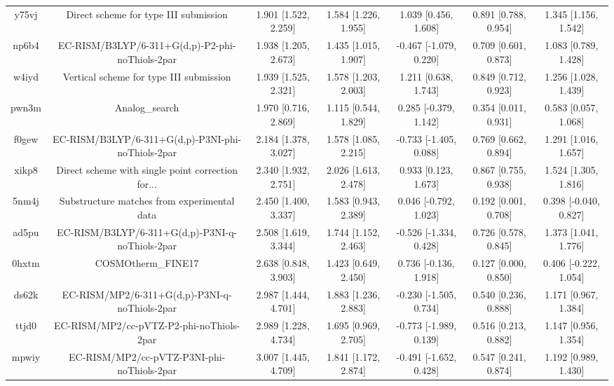 \documentclass{article}
\begin{document}
\begin{center}
\begin{longtable}{|ccccccc|}
 y75vj &              Direct scheme for type III submission &  1.901 [1.522, 2.259] &  1.584 [1.226, 1.955] &     1.039 [0.456, 1.608] &  0.891 [0.788, 0.954] &   1.345 [1.156, 1.542] \\
 np6b4 &    EC-RISM/B3LYP/6-311+G(d,p)-P2-phi-noThiols-2par &  1.938 [1.205, 2.673] &  1.435 [1.015, 1.907] &   -0.467 [-1.079, 0.220] &  0.709 [0.601, 0.873] &   1.083 [0.789, 1.428] \\
 w4iyd &            Vertical scheme for type III submission &  1.939 [1.525, 2.321] &  1.578 [1.203, 2.003] &     1.211 [0.638, 1.743] &  0.849 [0.712, 0.923] &   1.256 [1.028, 1.439] \\
 pwn3m &                                     Analog\_search &  1.970 [0.716, 2.869] &  1.115 [0.544, 1.829] &    0.285 [-0.379, 1.142] &  0.354 [0.011, 0.931] &   0.583 [0.057, 1.068] \\
 f0gew &  EC-RISM/B3LYP/6-311+G(d,p)-P3NI-phi-noThiols-2par &  2.184 [1.378, 3.027] &  1.578 [1.085, 2.215] &   -0.733 [-1.405, 0.088] &  0.769 [0.662, 0.894] &   1.291 [1.016, 1.657] \\
 xikp8 &  Direct scheme with single point correction for... &  2.340 [1.932, 2.751] &  2.026 [1.613, 2.478] &     0.933 [0.123, 1.673] &  0.867 [0.755, 0.938] &   1.524 [1.305, 1.816] \\
 5nm4j &        Substructure matches from experimental data &  2.450 [1.400, 3.337] &  1.583 [0.943, 2.389] &    0.046 [-0.792, 1.023] &  0.192 [0.001, 0.708] &  0.398 [-0.040, 0.827] \\
 ad5pu &    EC-RISM/B3LYP/6-311+G(d,p)-P3NI-q-noThiols-2par &  2.508 [1.619, 3.344] &  1.744 [1.152, 2.463] &   -0.526 [-1.334, 0.428] &  0.726 [0.578, 0.845] &   1.373 [1.041, 1.776] \\
 0hxtm &                                 COSMOtherm\_FINE17 &  2.638 [0.848, 3.903] &  1.423 [0.649, 2.450] &    0.736 [-0.136, 1.918] &  0.127 [0.000, 0.850] &  0.406 [-0.222, 1.054] \\
 ds62k &      EC-RISM/MP2/6-311+G(d,p)-P3NI-q-noThiols-2par &  2.987 [1.444, 4.701] &  1.883 [1.236, 2.883] &   -0.230 [-1.505, 0.734] &  0.540 [0.236, 0.888] &   1.171 [0.967, 1.384] \\
 ttjd0 &           EC-RISM/MP2/cc-pVTZ-P2-phi-noThiols-2par &  2.989 [1.228, 4.734] &  1.695 [0.969, 2.705] &   -0.773 [-1.989, 0.139] &  0.516 [0.213, 0.882] &   1.147 [0.956, 1.354] \\
 mpwiy &         EC-RISM/MP2/cc-pVTZ-P3NI-phi-noThiols-2par &  3.007 [1.445, 4.709] &  1.841 [1.172, 2.874] &   -0.491 [-1.652, 0.428] &  0.547 [0.241, 0.874] &   1.192 [0.989, 1.430] \\

\end{longtable}
\end{center}
\end{document}
